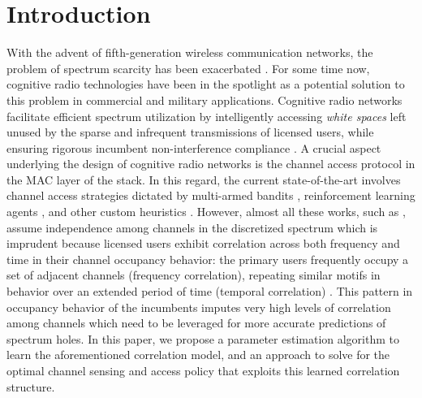 \documentclass[10pt,twocolumn]{IEEEtran}
\begin{document}
\section{Introduction}\label{I}
With the advent of fifth-generation wireless communication networks, the problem of spectrum scarcity has been exacerbated \cite{7158089}. For some time now, cognitive radio technologies have been in the spotlight as a potential solution to this problem in commercial and military applications. Cognitive radio networks facilitate efficient spectrum utilization by intelligently accessing \emph{white spaces} left unused by the sparse and infrequent transmissions of licensed users, while ensuring rigorous incumbent non-interference compliance \cite{4562537}. A crucial aspect underlying the design of cognitive radio networks is the channel access protocol in the MAC layer of the stack. In this regard, the current state-of-the-art involves channel access strategies dictated by multi-armed bandits \cite{7094730}, reinforcement learning agents \cite{6507570}, and other custom heuristics \cite{6956794, 4554696}. However, almost all these works, such as \cite{7094730, 6507570}, assume independence among channels in the discretized spectrum which is imprudent because licensed users exhibit correlation across both frequency and time in their channel occupancy behavior: the primary users frequently occupy a set of adjacent channels (frequency correlation), repeating similar motifs in behavior over an extended period of time (temporal correlation) \cite{6188346, 4213046,McHenry:2006:CSO:1234388.1234389}. This pattern in occupancy behavior of the incumbents imputes very high levels of correlation among channels which need to be leveraged for more accurate predictions of spectrum holes. In this paper, we propose a parameter estimation algorithm to learn the aforementioned correlation model, and an approach to solve for the optimal channel sensing and access policy that exploits this learned correlation structure.
\end{document}
